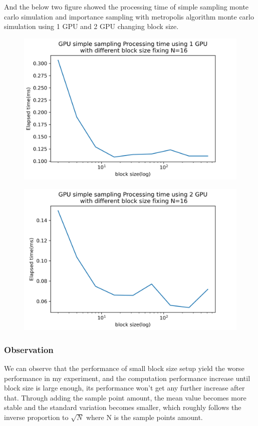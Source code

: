 \documentclass{article}
\begin{document}
	And the below two figure showed the processing time of simple sampling monte carlo simulation and importance sampling with metropolis algorithm monte carlo simulation using 1 GPU and 2 GPU changing block size.
	\begin{figure}[hb!]
		\centering
		\includegraphics[width=\linewidth]{notebook/1gpu_ss_pt}
	\end{figure}
	\begin{figure}[hb!]
		\centering
		\includegraphics[width=\linewidth]{notebook/2gpu_ss_pt}
	\end{figure}

	\subsubsection{Observation}
	We can observe that the performance of small block size setup yield the worse performance in my experiment, and the computation performance increase until block size is large enough, its performance won't get any further increase after that. Through adding the sample point amount, the mean value becomes more stable and the standard variation becomes smaller, which roughly follows the inverse proportion to $\sqrt{N}$ where N is the sample points amount. 
	
\end{document}
